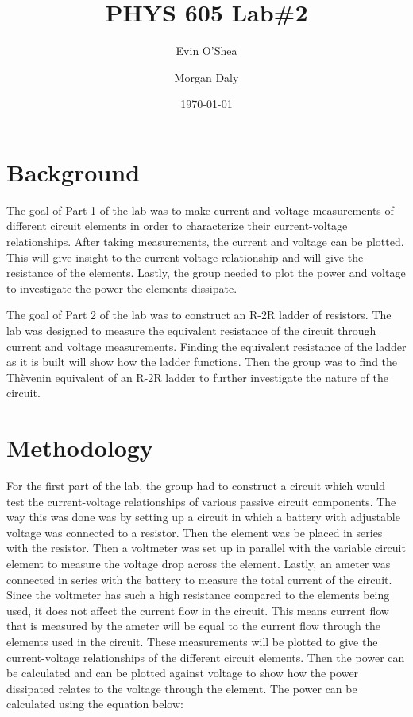 \documentclass[twocolumn, amsmath]{revtex4}
\begin{document}
\title{PHYS 605 Lab\#2} 

\author{Evin O'Shea}  %
\author{Morgan Daly}
\date{\today}  


\begin{abstract}

	

\end{abstract}

\maketitle

%
%
\section{Background}
The goal of Part 1 of the lab was to make current and voltage measurements of different circuit elements in order to characterize their current-voltage relationships. After taking measurements, the current and voltage can be plotted. This will give insight to the current-voltage relationship and will give the resistance of the elements. Lastly, the group needed to plot the power and voltage to investigate the power the elements dissipate.

The goal of Part 2 of the lab was to construct an R-2R ladder of resistors. The lab was designed to measure the equivalent resistance of the circuit through current and voltage measurements. Finding the equivalent resistance of the ladder as it is built will show how the ladder functions. Then the group was to find the Th\`{e}venin equivalent of an R-2R ladder to further investigate the nature of the circuit.


\section{Methodology}
For the first part of the lab, the group had to construct a circuit which would test the current-voltage relationships of various passive circuit components. The way this was done was by setting up a circuit in which a battery with adjustable voltage was connected to a resistor. Then the element was be placed in series with the resistor. Then a voltmeter was set up in parallel with the variable circuit element to measure the voltage drop across the element. Lastly, an ameter was connected in series with the battery to measure the total current of the circuit. Since the voltmeter has such a high resistance compared to the elements being used, it does not affect the current flow in the circuit. This means current flow that is measured by the ameter will be equal to the current flow through the elements used in the circuit. These measurements will be plotted to give the current-voltage relationships of the different circuit elements. Then the power can be calculated and can be plotted against voltage to show how the power dissipated relates to the voltage through the element. The power can be calculated using the equation below:
\end{document}
